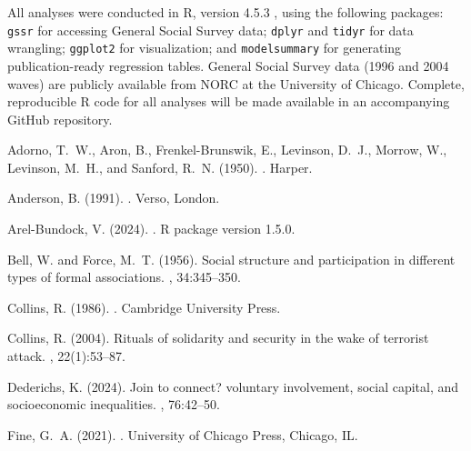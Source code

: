 \documentclass[12pt,letterpaper]{article}
\begin{document}
All analyses were conducted in R, version 4.5.3 \citep{rcoreteam2024language}, using the following packages: \texttt{gssr} \citep{healy2024gssr} for accessing General Social Survey data; \texttt{dplyr} and \texttt{tidyr} \citep{wickham2023dplyr, wickham2023tidyr} for data wrangling; \texttt{ggplot2} \citep{wickham2016ggplot2} for visualization; and \texttt{modelsummary} \citep{arel-bundock2024modelsummary} for generating publication-ready regression tables. General Social Survey data (1996 and 2004 waves) are publicly available from NORC at the University of Chicago. Complete, reproducible R code for all analyses will be made available in an accompanying GitHub repository.

\clearpage
\begin{thebibliography}{}

Adorno, T.~W., Aron, B., Frenkel-Brunswik, E., Levinson, D.~J., Morrow, W.,
  Levinson, M.~H., and Sanford, R.~N. (1950).
.
\newblock Harper.

Anderson, B. (1991).
.
\newblock Verso, London.

Arel-Bundock, V. (2024).
.
\newblock R package version 1.5.0.

Bell, W. and Force, M.~T. (1956).
\newblock Social structure and participation in different types of formal
  associations.
, 34:345--350.

Collins, R. (1986).
.
\newblock Cambridge University Press.

Collins, R. (2004).
\newblock Rituals of solidarity and security in the wake of terrorist attack.
, 22(1):53--87.

Dederichs, K. (2024).
\newblock Join to connect? voluntary involvement, social capital, and
  socioeconomic inequalities.
, 76:42--50.

Fine, G.~A. (2021).
.
\newblock University of Chicago Press, Chicago, IL.


\end{thebibliography}
\end{document}
